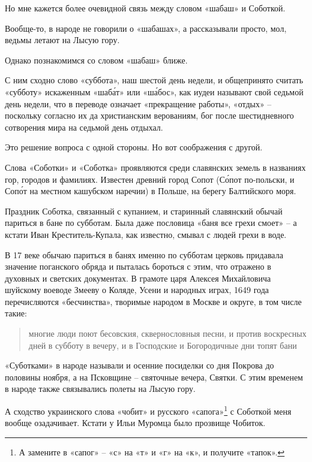 Но мне кажется более очевидной связь между словом «шабаш» и Соботкой.

Вообще-то, в народе не говорили о «шабашах», а рассказывали просто, мол, ведьмы летают на Лысую гору.

Однако познакомимся со словом «шабаш» ближе. 

С ним сходно слово «суббота», наш шестой день недели, и общепринято считать «субботу» искаженным «шаб\'ат» или «ш\'абос», как иудеи называют свой седьмой день недели, что в переводе означает «прекращение работы», «отдых» – поскольку согласно их да христианским верованиям, бог после шестидневного сотворения мира на седьмой день отдыхал.

Это решение вопроса с одной стороны. Но вот соображения с другой. 

Слова «Соботки» и «Соботка» проявляются среди славянских земель в названиях гор, городов и фамилиях. Известен древний город Сопот (С\'опот по-польски, и Соп\'от на местном кашубском наречии) в Польше, на берегу Балтийского моря.

Праздник Соботка, связанный с купанием, и старинный славянский обычай париться в бане по субботам. Была даже пословица «баня все грехи смоет» – а кстати Иван Креститель-Купала, как известно, смывал с людей грехи в воде. 

В 17 веке обычаю париться в банях именно по субботам церковь придавала значение поганского обряда и пыталась бороться с этим, что отражено в духовных и светских документах. В грамоте царя Алексея Михайловича шуйскому воеводе Змееву о Коляде, Усени и народных играх, 1649 года перечисляются «бесчинства», творимые народом в Москве и округе, в том числе такие:

\begin{quotation}
многие люди поют бесовския, сквернословныя песни, и против воскресных дней в субботу в вечеру, и в Господские и Богородичные дни топят бани
\end{quotation}


«Суботками» в народе называли и осенние посиделки со дня Покрова до половины ноября, а на Псковщине – святочные вечера, Святки. С этим временем в народе также связывались полеты на Лысую гору.

А сходство украинского слова «чобит» и русского «сапога»\footnote{А замените в «сапог» – «с» на «т» и «г» на «к», и получите «тапок».} с Соботкой меня вообще озадачивает. Кстати у Ильи Муромца было прозвище Чобиток.

